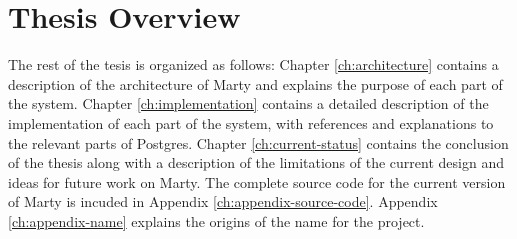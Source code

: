 \section{Thesis Overview}
The rest of the tesis is organized as follows: Chapter \ref{ch:architecture} contains a description of the architecture of Marty and explains the purpose of each part of the system.
Chapter \ref{ch:implementation} contains a detailed description of the implementation of each part of the system, with references and explanations to the relevant parts of Postgres.
Chapter \ref{ch:current-status} contains the conclusion of the thesis along with a description of the limitations of the current design and ideas for future work on Marty.
The complete source code for the current version of Marty is incuded in Appendix \ref{ch:appendix-source-code}.
Appendix \ref{ch:appendix-name} explains the origins of the name for the project.
